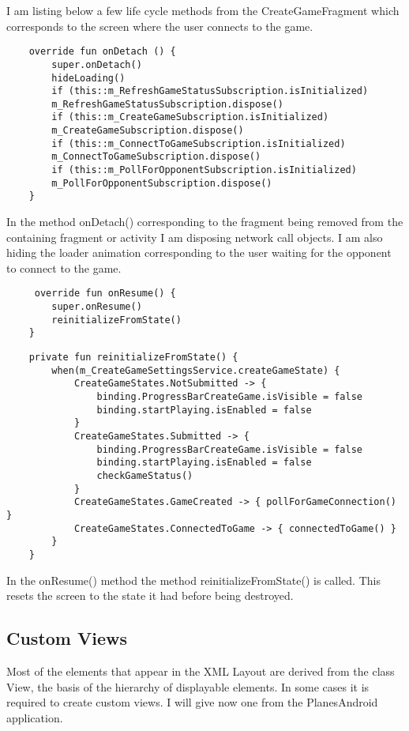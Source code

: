 I am listing below a few life cycle methods from the CreateGameFragment which corresponds to the screen where the user connects to the game.

\begin{lstlisting}
	override fun onDetach () {
		super.onDetach()
		hideLoading()
		if (this::m_RefreshGameStatusSubscription.isInitialized)
		m_RefreshGameStatusSubscription.dispose()
		if (this::m_CreateGameSubscription.isInitialized)
		m_CreateGameSubscription.dispose()
		if (this::m_ConnectToGameSubscription.isInitialized)
		m_ConnectToGameSubscription.dispose()
		if (this::m_PollForOpponentSubscription.isInitialized)
		m_PollForOpponentSubscription.dispose()
	}
\end{lstlisting}

In the method onDetach() corresponding to the fragment being removed from the containing fragment or activity I am disposing network call objects. I am also hiding the loader animation corresponding to the user waiting for the opponent to connect to the game. 

\begin{lstlisting}
	 override fun onResume() {
		super.onResume()
		reinitializeFromState()
	}
\end{lstlisting}

\begin{lstlisting}
	private fun reinitializeFromState() {
		when(m_CreateGameSettingsService.createGameState) {
			CreateGameStates.NotSubmitted -> {
				binding.ProgressBarCreateGame.isVisible = false
				binding.startPlaying.isEnabled = false
			}
			CreateGameStates.Submitted -> {
				binding.ProgressBarCreateGame.isVisible = false
				binding.startPlaying.isEnabled = false
				checkGameStatus()
			}
			CreateGameStates.GameCreated -> { pollForGameConnection() }
			CreateGameStates.ConnectedToGame -> { connectedToGame() }
		}
	}
\end{lstlisting}

In the onResume() method the method reinitializeFromState() is called. This resets the screen to the state it had before being destroyed.

\subsection{Custom Views} \label{custom_views}

Most of the elements that appear in the XML Layout are derived from the class View, the basis of the hierarchy of displayable elements. In some cases it is required to create custom views. I will give now one from the PlanesAndroid application.

